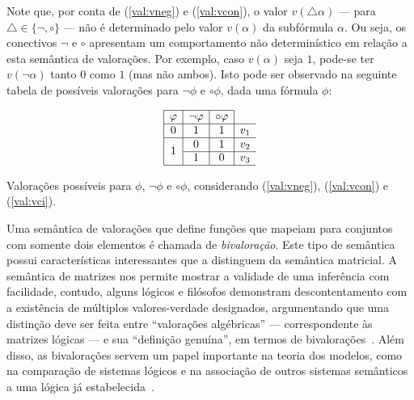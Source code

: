         Note que, por conta de (\ref{val:vneg}) e (\ref{val:vcon}), o valor $v(\triangle \alpha)$ {---} para $\triangle \in \{\neg, \circ\}$ {---} não é determinado pelo valor $v(\alpha)$ da subfórmula $\alpha$. Ou seja, os conectivos $\neg$ e $\circ$ apresentam um comportamento não determinístico em relação a esta semântica de valorações. Por exemplo, caso $v(\alpha)$ seja $1$, pode-se ter $v(\neg \alpha)$ tanto $0$ como $1$ (mas não ambos). Isto pode ser observado na seguinte tabela de possíveis valorações para $\neg \phi$ e $\circ \phi$, dada uma fórmula $\phi$:

        \begin{table}[h]
            \[
                \begin{array}{|c|c|c|c}%
                    \cline{1-3}
                    \phi & \neg\phi & \circ\phi & \\ \hline%
                    0 & 1 & 1 & v_1 \\ \hline%
                    \multirow{2}{*}{1} & 0 & 1 & v_2 \\ \cline{2-4}
                    & 1 & 0 & v_3 \\ \hline%
                \end{array}
                \]
                \caption{Valorações possíveis para $\phi$, $\neg \phi$ e $\circ \phi$, considerando (\ref{val:vneg}), (\ref{val:vcon}) e (\ref{val:vci}).}\label{tab:negcirc}
        \end{table}

        Uma semântica de valorações que define funções que mapeiam para conjuntos com somente dois elementos é chamada de \textit{bivaloração}. Este tipo de semântica possui características interessantes que a distinguem da semântica matricial. A semântica de matrizes nos permite mostrar a validade de uma inferência com facilidade, contudo, alguns lógicos e filósofos demonstram descontentamento com a existência de múltiplos valores-verdade designados, argumentando que uma distinção deve ser feita entre ``valorações algébricas'' {---} correspondente às matrizes lógicas {---} e sua ``definição genuína'', em termos de bivalorações~\cite{Suszko1975-SUSROL}. Além disso, as bivalorações servem um papel importante na teoria dos modelos, como na comparação de sistemas lógicos e na associação de outros sistemas semânticos a uma lógica já estabelecida~\cite{bivalence}.

        
                
